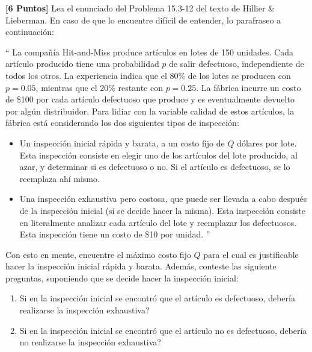 \documentclass[ a4paper, twoside, 11pt]{article}
\begin{document}
\begin{problem}
\label{prob:H&L_P15_3_12}
\textbf{[6 Puntos]} Lea el enunciado del Problema 15.3-12 del texto de Hillier \& Lieberman. En caso de que lo encuentre dif\'icil de entender, lo parafraseo a continuaci\'on: 

`` La compa\~n\'ia Hit-and-Miss produce art\'iculos en lotes de 150 unidades. Cada art\'iculo producido tiene una probabilidad $p$ de salir defectuoso, independiente de todos los otros. La experiencia indica que el 80\% de los lotes se producen con $p = 0.05$, mientras que el 20\% restante con $p = 0.25$. La f\'abrica incurre un costo de \$100 por cada art\'iculo defectuoso que produce y es eventualmente devuelto por alg\'un distribuidor. Para lidiar con la variable calidad de estos art\'iculos, la f\'abrica est\'a considerando los dos siguientes tipos de inspecci\'on: 
\begin{itemize}
\item Un inspecci\'on inicial r\'apida y barata, a un costo fijo de $Q$ d\'olares por lote. Esta inspecci\'on consiste en elegir uno de los art\'iculos del lote producido, al azar, y determinar si es defectuoso o no. Si el art\'iculo es defectuoso, se lo reemplaza ah\'i mismo. 
\item Una inspecci\'on exhaustiva pero costosa, que puede ser llevada a cabo despu\'es de la inspecci\'on inicial (si se decide hacer la misma). Esta inspecci\'on consiste en literalmente analizar cada art\'iculo del lote y reemplazar los defectuosos. Esta inspecci\'on tiene un costo de \$10 por unidad. '' 
\end{itemize}

Con esto en mente, encuentre el m\'aximo costo fijo $Q$ para el cual es justificable hacer la inspecci\'on inicial r\'apida y barata. Adem\'as, conteste las siguiente preguntas, suponiendo que se decide hacer la inspecci\'on inicial: 
\begin{enumerate}[label=\textbf{\alph*)}]
\item Si en la inspecci\'on inicial se encontr\'o que el art\'iculo es defectuoso, deber\'ia realizarse la inspecci\'on exhaustiva? 
\item Si en la inspecci\'on inicial se encontr\'o que el art\'iculo no es defectuoso, deber\'ia no realizarse la inspecci\'on exhaustiva? 
\end{enumerate}

\end{problem}
\fullskip
\end{document}
